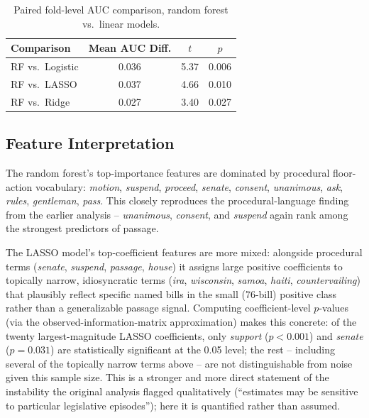 \begin{table}[htbp]
\centering
\caption{Paired fold-level AUC comparison, random forest vs.\ linear models.}
\label{tab:paired_ttest}
\begin{tabular}{lccc}
\toprule
\textbf{Comparison} & \textbf{Mean AUC Diff.} & \textbf{$t$} & \textbf{$p$} \\
\midrule
RF vs.\ Logistic & 0.036 & 5.37 & 0.006 \\
RF vs.\ LASSO    & 0.037 & 4.66 & 0.010 \\
RF vs.\ Ridge    & 0.027 & 3.40 & 0.027 \\
\bottomrule
\end{tabular}
\end{table}

\subsection{Feature Interpretation}
\label{sec:feature-interpretation}

The random forest's top-importance features are dominated by procedural floor-action vocabulary: \textit{motion}, \textit{suspend}, \textit{proceed}, \textit{senate}, \textit{consent}, \textit{unanimous}, \textit{ask}, \textit{rules}, \textit{gentleman}, \textit{pass}. This closely reproduces the procedural-language finding from the earlier analysis -- \textit{unanimous}, \textit{consent}, and \textit{suspend} again rank among the strongest predictors of passage.

The LASSO model's top-coefficient features are more mixed: alongside procedural terms (\textit{senate}, \textit{suspend}, \textit{passage}, \textit{house}) it assigns large positive coefficients to topically narrow, idiosyncratic terms (\textit{ira}, \textit{wisconsin}, \textit{samoa}, \textit{haiti}, \textit{countervailing}) that plausibly reflect specific named bills in the small (76-bill) positive class rather than a generalizable passage signal. Computing coefficient-level $p$-values (via the observed-information-matrix approximation) makes this concrete: of the twenty largest-magnitude LASSO coefficients, only \textit{support} ($p<0.001$) and \textit{senate} ($p=0.031$) are statistically significant at the 0.05 level; the rest -- including several of the topically narrow terms above -- are not distinguishable from noise given this sample size. This is a stronger and more direct statement of the instability the original analysis flagged qualitatively (``estimates may be sensitive to particular legislative episodes''); here it is quantified rather than assumed.

